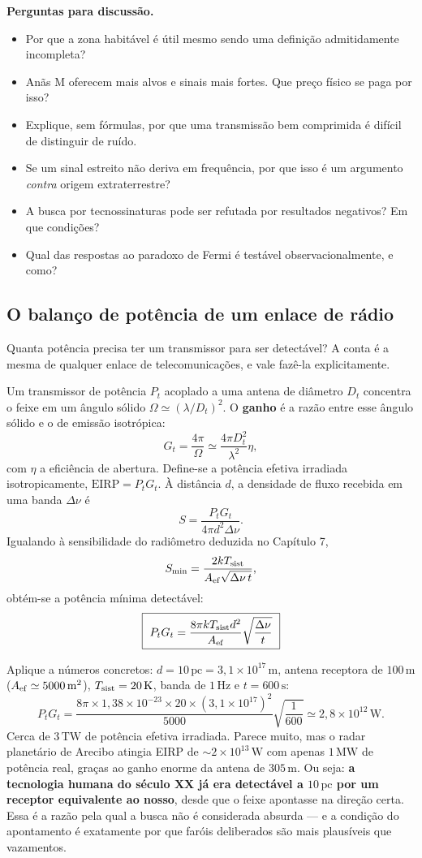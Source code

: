 \documentclass[11pt,a4paper]{article}
\begin{document}
\textbf{Perguntas para discussão.}
\begin{itemize}
\item Por que a zona habitável é útil mesmo sendo uma definição admitidamente incompleta?
\item Anãs M oferecem mais alvos e sinais mais fortes. Que preço físico se paga por isso?
\item Explique, sem fórmulas, por que uma transmissão bem comprimida é difícil de distinguir de ruído.
\item Se um sinal estreito não deriva em frequência, por que isso é um argumento \emph{contra} origem extraterrestre?
\item A busca por tecnossinaturas pode ser refutada por resultados negativos? Em que condições?
\item Qual das respostas ao paradoxo de Fermi é testável observacionalmente, e como?
\end{itemize}

\subsection*{O balanço de potência de um enlace de rádio}

Quanta potência precisa ter um transmissor para ser detectável? A conta é a mesma de qualquer enlace de telecomunicações, e vale fazê-la explicitamente.

Um transmissor de potência $P_t$ acoplado a uma antena de diâmetro $D_t$ concentra o feixe em um ângulo sólido $\Omega\simeq(\lambda/D_t)^{2}$. O \textbf{ganho} é a razão entre esse ângulo sólido e o de emissão isotrópica:
\[
G_t=\frac{4\pi}{\Omega}\simeq\frac{4\pi D_t^{2}}{\lambda^{2}}\eta,
\]
com $\eta$ a eficiência de abertura. Define-se a potência efetiva irradiada isotropicamente, $\mathrm{EIRP}=P_tG_t$. À distância $d$, a densidade de fluxo recebida em uma banda $\Delta\nu$ é
\[
S=\frac{P_tG_t}{4\pi d^{2}\Delta\nu}.
\]
Igualando à sensibilidade do radiômetro deduzida no Capítulo 7,
\[
S_{\rm min}=\frac{2kT_{\rm sist}}{A_{\rm ef}\sqrt{\Delta\nu\,t}},
\]
obtém-se a potência mínima detectável:
\[
\boxed{\ P_tG_t=\frac{8\pi kT_{\rm sist}d^{2}}{A_{\rm ef}}\sqrt{\frac{\Delta\nu}{t}}\ }
\]

Aplique a números concretos: $d=10\,\mathrm{pc}=3{,}1\times10^{17}\,\mathrm{m}$, antena receptora de $100\,\mathrm{m}$ ($A_{\rm ef}\simeq5000\,\mathrm{m^{2}}$), $T_{\rm sist}=20\,\mathrm{K}$, banda de $1\,\mathrm{Hz}$ e $t=600\,\mathrm{s}$:
\[
P_tG_t=\frac{8\pi\times1{,}38\times10^{-23}\times20\times(3{,}1\times10^{17})^{2}}{5000}\sqrt{\frac{1}{600}}
\simeq2{,}8\times10^{12}\,\mathrm{W}.
\]
Cerca de $3\,\mathrm{TW}$ de potência efetiva irradiada. Parece muito, mas o radar planetário de Arecibo atingia EIRP de $\sim2\times10^{13}\,\mathrm{W}$ com apenas $1\,\mathrm{MW}$ de potência real, graças ao ganho enorme da antena de $305\,\mathrm{m}$. Ou seja: \textbf{a tecnologia humana do século XX já era detectável a $10\,\mathrm{pc}$ por um receptor equivalente ao nosso}, desde que o feixe apontasse na direção certa. Essa é a razão pela qual a busca não é considerada absurda --- e a condição do apontamento é exatamente por que faróis deliberados são mais plausíveis que vazamentos.
\end{document}
